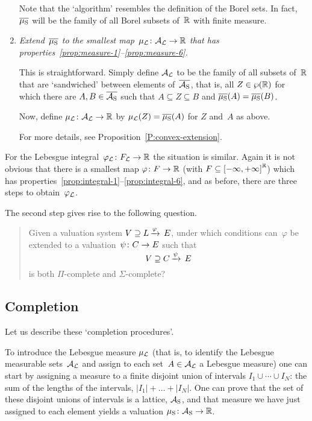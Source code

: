 \documentclass[main.tex]{subfiles}
\begin{document}
\begin{enumerate}
Note that the `algorithm' resembles the  definition
of the Borel sets.
In fact, $\overline{\mu_{\mathrm{S}}}$
will be the family of all Borel subsets of~$\mathbb{R}$
with finite measure.


\item
\emph{Extend~$\overline{\mu_{\mathrm{S}}}$
to the smallest map~$\mu_{\mathcal{L}}\colon \mathcal{A}_{\mathcal{L}} \rightarrow \mathbb{R}$
that has properties~\ref{prop:measure-1}--\ref{prop:measure-6}.}

This is straightforward.
Simply
define $\mathcal{A}_{\mathcal{L}}$ to be the family of all subsets of~$\mathbb{R}$
that are `sandwiched' between elements of~$\overline{\mathcal{A}_{\mathrm{S}}}$,
that is,
all $Z\in\wp(\mathbb{R})$
for which
there are $A,B\in \overline{\mathcal{A}_{\mathrm{S}}}$
such that $A\subseteq Z\subseteq B$ and 
$\overline{\mu_{\mathrm{S}}}(A) = \overline{\mu_{\mathrm{S}}}(B)$.

Now, define $\mu_{\mathcal{L}}\colon \mathcal{A}_{\mathcal{L}} \rightarrow \mathbb{R}$
by $\mu_{\mathcal{L}} (Z) = \overline{\mu_{\mathrm{S}}} (A)$ for $Z$ and~$A$ as above.

For more details,
see Proposition~\ref{P:convex-extension}.
\end{enumerate}

\noindent
For the Lebesgue integral~$\varphi_{\mathcal{L}}\colon F_{\mathcal{L}}\rightarrow \mathbb{R}$ the situation is similar.
Again it is not obvious that
there is a smallest map $\varphi\colon F\rightarrow \mathbb{R}$
(with $F\subseteq\smash{{[-\infty,+\infty]}^{\mathbb{R}}}$)
which has 
properties~\ref{prop:integral-1}--\ref{prop:integral-6},
and as before,
there are three steps to obtain~$\varphi_{\mathcal{L}}$.

The second step gives rise to the following question.
\begin{quote}
Given a valuation system $V \supseteq L\,\smash{\xrightarrow{\varphi}\,E}$,
under which conditions
can~$\varphi$
be extended to a valuation~$\psi\colon C\rightarrow E$
such that 
\begin{equation*}
V \supseteq C\,\smash{\xrightarrow{\psi}\,E}
\end{equation*}
is both $\Pi$-complete and $\Sigma$-complete?
\end{quote}









\subsection{Completion}
Let us describe these `completion procedures'.

To introduce the Lebesgue measure $\mu_{\mathcal{L}}$
(that is,
to identify the Lebesgue measurable sets~$\mathcal{A}_{\mathcal{L}}$
and assign to each set~$A\in\mathcal{A}_{\mathcal{L}}$ a Lebesgue measure)
one can start by
assigning a measure to a finite disjoint union
of intervals 
$I_1 \cup\dotsb\cup I_N$:
the sum of the lengths of the intervals,
$|I_1|+\dots+|I_N|$.
One can prove that the set of these disjoint
unions of intervals is a lattice, $\mathcal{A}_{\mathrm{S}}$,
and that measure we have just assigned
to each element
yields  a valuation $\mu_{\mathrm{S}}\colon \mathcal{A}_{\mathrm{S}}\rightarrow\mathbb{R}$.
\end{document}
